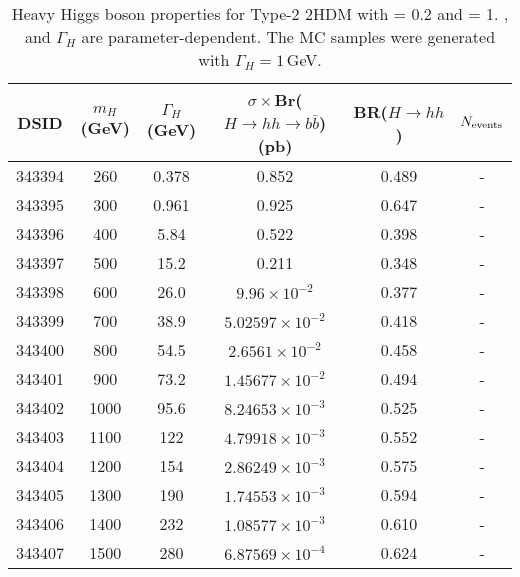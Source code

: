 \begin{table}[h]
\begin{center}
\begin{tabular}{c | c | c | c | c | c}\hline
DSID & $m_H$ (GeV) & $\Gamma_H$ (GeV) & $\sigma\times$Br($H\to hh \to b\bar{b}$) (pb) &  BR($H\to hh$) & $N_{\rm{events}}$\\\hline
343394 & 260 & 0.378 & 0.852 				& 0.489 &  -  \\
343395 & 300 & 0.961 & 0.925 				& 0.647 &  - \\
343396 & 400 & 5.84 & 0.522 				& 0.398 &  - \\
343397 & 500 & 15.2 & 0.211 				& 0.348 &  - \\
343398 & 600 & 26.0 & $9.96\times10^{-2}$ 	& 0.377 &  - \\
343399 & 700 & 38.9 &$ 5.02597\times10^{-2}$ & 0.418 &  - \\
343400 & 800 & 54.5 & $2.6561\times10^{-2}$ & 0.458 &  - \\
343401 & 900 & 73.2 & $1.45677\times10^{-2}$ & 0.494 &  - \\
343402 & 1000 & 95.6 & $8.24653\times10^{-3}$ & 0.525 &  - \\
343403 & 1100 & 122 & $4.79918\times10^{-3}$ & 0.552 &  - \\
343404 & 1200 & 154 & $2.86249\times10^{-3}$ & 0.575 &  - \\
343405 & 1300 & 190 & $1.74553\times10^{-3}$ & 0.594 &  - \\
343406 & 1400 & 232 & $1.08577\times10^{-3}$ & 0.610 &  - \\
343407 & 1500 & 280 & $6.87569\times10^{-4}$ & 0.624 &  - \\
\hline
\end{tabular}
\caption{Heavy Higgs boson properties for Type-2 2HDM with \cba = 0.2 and \tanb = 1. \BrHhh, \Brhbb and $\Gamma_H$ are parameter-dependent. The MC samples were generated with $\Gamma_H = 1$\,GeV.}
\label{tab:signal_2hdm_xsec}
\end{center}
\end{table}
 

